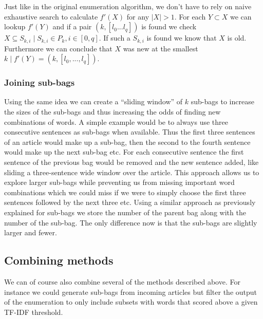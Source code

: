 Just like in the original enumeration algorithm, we don't have to rely on naive exhaustive search to calculate $f'(X)$ for any $|X|>1$. For each $Y\subset X$ we can lookup $f'(Y)$ and if a pair $(k, [l_{0}... l_{q}])$ is found we check $X \subseteq S_{k, i} \mid S_{k, i} \in P_{k}, i\in[0,q]$. If such a $S_{k,i}$ is found we know that $X$ is old. Furthermore we can conclude that $X$ was new at the smallest $k \mid f'(Y)=(k, [l_{0},..., l_{q}])$.

\subsubsection{Joining sub-bags}
Using the same idea we can create a ``sliding window'' of $k$ sub-bags to increase the sizes of the sub-bags and thus increasing the odds of finding new combinations of words. A simple example would be to always use three consecutive sentences as sub-bags when available. Thus the first three sentences of an article would make up a sub-bag, then the second to the fourth sentence would make up the next sub-bag etc. For each consecutive sentence the first sentence of the previous bag would be removed and the new sentence added, like sliding a three-sentence wide window over the article. This approach allows us to explore larger sub-bags while preventing us from missing important word combinations which we could miss if we were to simply choose the first three sentences followed by the next three etc. Using a similar approach as previously explained for sub-bags we store the number of the parent bag along with the number of the sub-bag. The only difference now is that the sub-bags are slightly larger and fewer.

\subsection{Combining methods}
We can of course also combine several of the methods described above. For instance we could generate sub-bags from incoming articles but filter the output of the enumeration to only include subsets with words that scored above a given TF-IDF threshold.
